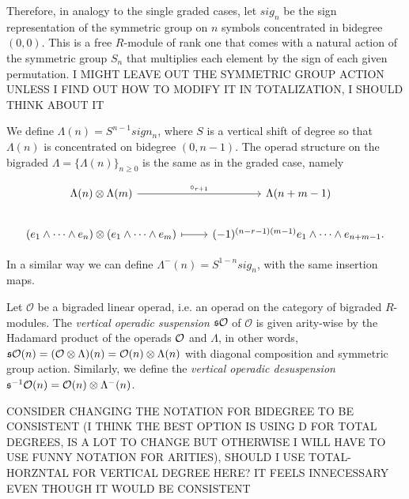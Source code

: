 \documentclass[twoside]{article}
\begin{document}

Therefore, in analogy to the single graded cases, let $sig_n$ be the sign representation of the symmetric group on $n$ symbols concentrated in bidegree $(0,0)$. This is a free $R$-module of rank one that comes with a natural action of the symmetric group $S_n$ that multiplies each element by the sign of each given permutation. I MIGHT LEAVE OUT THE SYMMETRIC GROUP  ACTION UNLESS I FIND OUT HOW TO MODIFY IT IN TOTALIZATION, I SHOULD THINK ABOUT IT

We define $\Lambda(n)=S^{n-1}sign_n$, where  $S$ is a vertical shift of degree so that $\Lambda(n)$ is concentrated on bidegree  $(0,n-1)$.
The operad structure on the bigraded $\Lambda=\{\Lambda(n)\}_{n\geq 0}$ is the same as in the graded case, namely

\[
\begin{tikzcd}
\Lambda(n)\otimes\Lambda(m) \arrow[r, "\circ_{r+1}"] & \Lambda(n+m-1)\\
(e_1\land\cdots\land e_n)\otimes(e_1\land\cdots\land e_m)\arrow[r, mapsto] & (-1)^{(n-r-1)(m-1)}e_1\land\cdots\land e_{n+m-1}.
\end{tikzcd}
\]



In a similar way we can define $\Lambda^-(n)=S^{1-n}sig_n$, with the same insertion maps.
\begin{definition}
Let $\mathcal{O}$ be a bigraded linear operad, i.e. an operad on the category of bigraded $R$-modules. The \emph{vertical operadic suspension} $\mathfrak{s}{\mathcal O}$ of $\mathcal{O}$ is given arity-wise by the Hadamard product of the operads ${\mathcal O}$ and $\Lambda$, in other words, $\mathfrak{s}{\mathcal O}(n)=(\mathcal{O}\otimes\Lambda)(n)=\mathcal{O}(n)\otimes\Lambda(n)$ with diagonal composition and symmetric group action. Similarly, we define the \emph{vertical operadic desuspension} $\mathfrak{s}^{-1}{\mathcal O}(n)=\mathcal{O}(n)\otimes\Lambda^-(n)$. %
\end{definition}

CONSIDER CHANGING THE NOTATION FOR BIDEGREE TO BE CONSISTENT (I THINK THE BEST OPTION IS USING D FOR TOTAL DEGREES, IS A LOT TO CHANGE BUT OTHERWISE I WILL HAVE TO USE FUNNY NOTATION FOR ARITIES), SHOULD I USE TOTAL-HORZNTAL FOR VERTICAL DEGREE HERE? IT FEELS INNECESSARY EVEN THOUGH IT WOULD BE CONSISTENT
\end{document}
